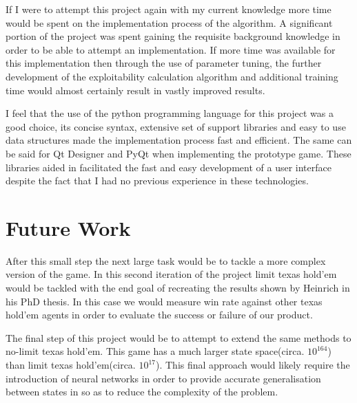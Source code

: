 If I were to attempt this project again with my current knowledge more time would be spent on the
implementation process of the algorithm.
A significant portion of the project was spent gaining the requisite background knowledge
in order to be able to attempt an implementation.
If more time was available for this implementation then through the use of parameter tuning,
the further development of the exploitability calculation algorithm and additional training
time would almost certainly result in vastly improved results.

I feel that the use of the python programming language for this project was a good choice,
its concise syntax, extensive set of support libraries and easy to use data structures
made the implementation process fast and efficient.
The same can be said for Qt Designer and PyQt when implementing the prototype game.
These libraries aided in facilitated the fast and easy development of a user interface despite the fact
that I had no previous experience in these technologies.

\section{Future Work}\label{sec:futureWork}

After this small step the next large task would be to tackle a more complex version of the game.
In this second iteration of the project limit texas hold'em would be tackled with the end goal of recreating
the results shown by Heinrich in his PhD thesis\citep{heinrich2017reinforcement}.
In this case we would measure win rate against other texas hold'em agents in order to evaluate
the success or failure of our product.

The final step of this project would be to attempt to extend the same methods to no-limit texas hold'em.
This game has a much larger state space(circa. $10^{164}$) than limit texas hold'em(circa. $10^{17}$).
This final approach would likely require the introduction of neural networks in order to provide accurate
generalisation between states in so as to reduce the complexity of the problem.